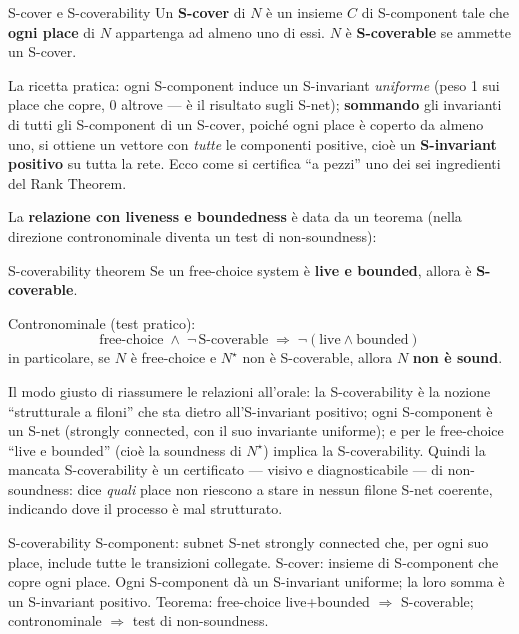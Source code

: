 \begin{definizione}{S-cover e S-coverability}
Un \textbf{S-cover} di $N$ è un insieme $C$ di S-component tale che \textbf{ogni place} di $N$ appartenga ad almeno uno di essi. $N$ è \textbf{S-coverable} se ammette un S-cover.
\end{definizione}

La ricetta pratica: ogni S-component induce un S-invariant \emph{uniforme} (peso 1 sui place che copre, 0 altrove — è il risultato sugli S-net); \textbf{sommando} gli invarianti di tutti gli S-component di un S-cover, poiché ogni place è coperto da almeno uno, si ottiene un vettore con \emph{tutte} le componenti positive, cioè un \textbf{S-invariant positivo} su tutta la rete. Ecco come si certifica ``a pezzi'' uno dei sei ingredienti del Rank Theorem.

La \textbf{relazione con liveness e boundedness} è data da un teorema (nella direzione contronominale diventa un test di non-soundness):

\begin{teorema}{S-coverability theorem}
Se un free-choice system è \textbf{live e bounded}, allora è \textbf{S-coverable}.

Contronominale (test pratico):
$$\text{free-choice} \;\wedge\; \neg\,\text{S-coverable} \;\Rightarrow\; \neg(\text{live}\wedge\text{bounded})$$
in particolare, se $N$ è free-choice e $N^\star$ non è S-coverable, allora $N$ \textbf{non è sound}.
\end{teorema}

Il modo giusto di riassumere le relazioni all'orale: la S-coverability è la nozione ``strutturale a filoni'' che sta dietro all'S-invariant positivo; ogni S-component è un S-net (strongly connected, con il suo invariante uniforme); e per le free-choice ``live e bounded'' (cioè la soundness di $N^\star$) implica la S-coverability. Quindi la mancata S-coverability è un certificato — visivo e diagnosticabile — di non-soundness: dice \emph{quali} place non riescono a stare in nessun filone S-net coerente, indicando dove il processo è mal strutturato.

\begin{puntochiave}{S-coverability}
S-component: subnet S-net strongly connected che, per ogni suo place, include tutte le transizioni collegate. S-cover: insieme di S-component che copre ogni place. Ogni S-component dà un S-invariant uniforme; la loro somma è un S-invariant positivo. Teorema: free-choice live+bounded $\Rightarrow$ S-coverable; contronominale $\Rightarrow$ test di non-soundness.
\end{puntochiave}
